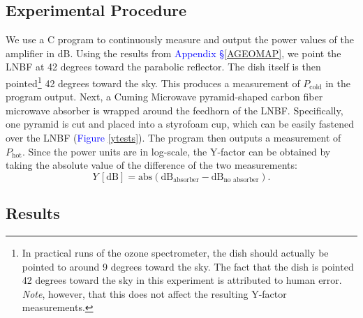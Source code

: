 \documentclass[11pt]{article}
\begin{document}
\subsection{Experimental Procedure}
We use a C program to continuously measure and output the power values of the amplifier in dB. Using the results from \textcolor{blue}{Appendix \S\ref{AGEOMAP}}, we point the LNBF at 42 degrees toward the parabolic reflector. The dish itself is then pointed\footnote{In practical runs of the ozone spectrometer, the dish should actually be pointed to around 9 degrees toward the sky. The fact that the dish is pointed 42 degrees toward the sky in this experiment is attributed to human error. \textit{Note}, however, that this does not affect the resulting Y-factor measurements.} 42 degrees toward the sky. This produces a measurement of $P_\text{cold}$ in the program output. Next, a Cuming Microwave pyramid-shaped carbon fiber microwave absorber is wrapped around the feedhorn of the LNBF. Specifically, one pyramid is cut and placed into a styrofoam cup, which can be easily fastened over the LNBF (\textcolor{blue}{Figure} \ref{ytests}). The program then outputs a measurement of $P_\text{hot}$. Since the power units are in log-scale, the Y-factor can be obtained by taking the absolute value of the difference of the two measurements:
	\begin{equation}
		Y\,[\text{dB}]= \text{abs}(\text{dB}_\text{absorber}-\text{dB}_\text{no absorber}).
	\end{equation}
\subsection{Results}
\end{document}
